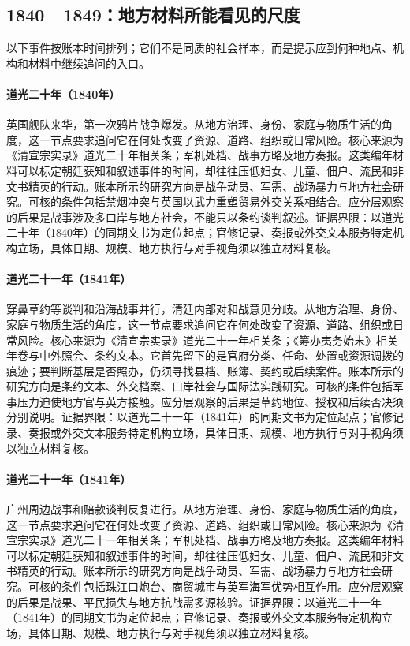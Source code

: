 \subsection{1840—1849：地方材料所能看见的尺度}
以下事件按账本时间排列；它们不是同质的社会样本，而是提示应到何种地点、机构和材料中继续追问的入口。
\hypertarget{social:EQ-1840-FIRST-OPIUM-WAR}{}\paragraph{道光二十年（1840年）}英国舰队来华，第一次鸦片战争爆发。从地方治理、身份、家庭与物质生活的角度，这一节点要求追问它在何处改变了资源、道路、组织或日常风险。核心来源为《清宣宗实录》道光二十年相关条；军机处档、战事方略及地方奏报。这类编年材料可以标定朝廷获知和叙述事件的时间，却往往压低妇女、儿童、佃户、流民和非文书精英的行动。账本所示的研究方向是战争动员、军需、战场暴力与地方社会研究。可核的条件包括禁烟冲突与英国以武力重塑贸易外交关系相结合。应分层观察的后果是战事涉及多口岸与地方社会，不能只以条约谈判叙述。证据界限：以道光二十年（1840年）的同期文书为定位起点；官修记录、奏报或外交文本服务特定机构立场，具体日期、规模、地方执行与对手视角须以独立材料复核。
\hypertarget{social:EQ-1841-CHUANBI-NEGOTIATIONS}{}\paragraph{道光二十一年（1841年）}穿鼻草约等谈判和沿海战事并行，清廷内部对和战意见分歧。从地方治理、身份、家庭与物质生活的角度，这一节点要求追问它在何处改变了资源、道路、组织或日常风险。核心来源为《清宣宗实录》道光二十一年相关条；《筹办夷务始末》相关年卷与中外照会、条约文本。它首先留下的是官府分类、任命、处置或资源调拨的痕迹；要判断基层是否照办，仍须寻找县档、账簿、契约或后续案件。账本所示的研究方向是条约文本、外交档案、口岸社会与国际法实践研究。可核的条件包括军事压力迫使地方官与英方接触。应分层观察的后果是草约地位、授权和后续否决须分别说明。证据界限：以道光二十一年（1841年）的同期文书为定位起点；官修记录、奏报或外交文本服务特定机构立场，具体日期、规模、地方执行与对手视角须以独立材料复核。
\hypertarget{social:EQ-1841-CANTON-BATTLES}{}\paragraph{道光二十一年（1841年）}广州周边战事和赔款谈判反复进行。从地方治理、身份、家庭与物质生活的角度，这一节点要求追问它在何处改变了资源、道路、组织或日常风险。核心来源为《清宣宗实录》道光二十一年相关条；军机处档、战事方略及地方奏报。这类编年材料可以标定朝廷获知和叙述事件的时间，却往往压低妇女、儿童、佃户、流民和非文书精英的行动。账本所示的研究方向是战争动员、军需、战场暴力与地方社会研究。可核的条件包括珠江口炮台、商贸城市与英军海军优势相互作用。应分层观察的后果是战果、平民损失与地方抗战需多源核验。证据界限：以道光二十一年（1841年）的同期文书为定位起点；官修记录、奏报或外交文本服务特定机构立场，具体日期、规模、地方执行与对手视角须以独立材料复核。
